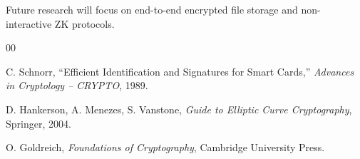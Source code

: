 \documentclass[conference]{IEEEtran}
\begin{document}
Future research will focus on end-to-end encrypted file storage and non-interactive ZK protocols.





\begin{thebibliography}{00}

C. Schnorr, ``Efficient Identification and Signatures for Smart Cards,''
\emph{Advances in Cryptology -- CRYPTO}, 1989.

D. Hankerson, A. Menezes, S. Vanstone,
\emph{Guide to Elliptic Curve Cryptography}, Springer, 2004.

O. Goldreich, \emph{Foundations of Cryptography}, Cambridge University Press.

\end{thebibliography}
\end{document}
